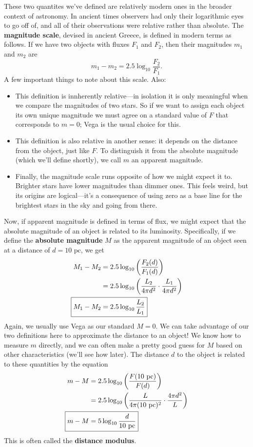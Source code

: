 \documentclass[../a062main.tex]{subfiles}
\begin{document}
These two quantites we've defined are relatively modern ones in the broader context of astronomy.
In ancient times observers had only their logarithmic eyes to go off of, and all of their observations were relative rather than absolute.
The \textbf{magnitude scale}, devised in ancient Greece, is defined in modern terms as follows.
If we have two objects with fluxes $F_1$ and $F_2$, then their magnitudes $m_1$ and $m_2$ are
\[ \boxed{m_1 - m_2 = 2.5 \log_{10} \frac{F_2}{F_1}}. \]
A few important things to note about this scale.
Also:
\begin{itemize}[topsep=0pt]
    \item This definition is innherently relative---in isolation it is only meaningful when we compare the magnitudes of two stars.
    So if we want to assign each object its own unique magnitude we must agree on a standard value of $F$ that corresponds to $m=0$; Vega is the usual choice for this.

    \item This definition is also relative in another sense: it depends on the distance from the object, just like $F$.
    To distinguish it from the absolute magnitude (which we'll define shortly), we call $m$ an apparent magnitude.

    \item Finally, the magnitude scale runs opposite of how we might expect it to.
    Brighter stars have lower magnitudes than dimmer ones.
    This feels weird, but its origins are logical---it's a consequence of using zero as a base line for the brightest stars in the sky and going from there.
\end{itemize}
Now, if apparent magnitude is defined in terms of flux, we might expect that the absolute magnitude of an object is related to its luminosity.
Specifically, if we define the \textbf{absolute magnitude} $M$ as the apparent magnitude of an object seen at a distance of $d = 10 \text{ pc}$, we get
\begin{align*}
    M_1 - M_2 &= 2.5 \log_{10} \left( \frac{F_2 (d)}{F_1 (d)} \right) \\
    &= 2.5 \log_{10} \left( \frac{L_2}{4 \pi d^2} \cdot \frac{L_1}{4 \pi d^2} \right) \\
    \Aboxed{M_1 - M_2 &= 2.5 \log_{10} \frac{L_2}{L_1}}
\end{align*}
Again, we usually use Vega as our standard $M=0$.
We can take advantage of our two definitions here to approximate the distance to an object!
We know how to measure $m$ directly, and we can often make a pretty good guess for $M$ based on other characteristics (we'll see how later).
The distance $d$ to the object is related to these quantities by the equation
\begin{align*}
    m - M &= 2.5 \log_{10} \left( \frac{F (10 \text{ pc})}{F (d)} \right) \\
    &= 2.5 \log_{10} \left( \frac{L}{4 \pi (10 \text{ pc})^2} \cdot \frac{4\pi d^2}{L} \right) \\
    \Aboxed{m - M &= 5 \log_{10} \frac{d}{10 \text{ pc}}}
\end{align*}
This is often called the \textbf{distance modulus}.
\end{document}
